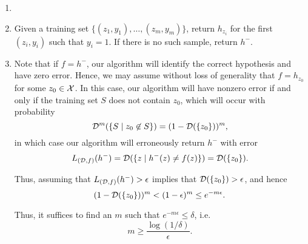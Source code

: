 \begin{ex}
  \begin{enumerate}
    \item[]
    \item Given a training set $\{(z_1, y_1), \ldots, (z_m, y_m)\}$,
          return $h_{z_i}$ for the first $(z_i, y_i)$ such that $y_i=1$.
          If there is no such sample, return $h^-$.
    \item Note that if $f=h^-$, our algorithm will identify the correct
          hypothesis and have zero error. Hence, we may assume without loss of
          generality that $f=h_{z_0}$ for some $z_0\in\mathcal{X}$. In this case, our
          algorithm will have nonzero error if and only if the training set $S$
          does not contain $z_0$, which will occur with probability
          \[
            \mathcal{D}^m(\{S \mid z_0\not\in S\})
            =(1-\mathcal{D}(\{z_0\}))^m,
          \]
          in which case our algorithm will erroneously
          return $h^-$ with error
          \[
            L_{(\mathcal{D}, f)}(h^-)=\mathcal{D}(\{z \mid h^-(z) \neq f(z) \})=\mathcal{D}(\{z_0\}).
          \]

          Thus, assuming that $L_{(\mathcal{D}, f)}(h^-)>\epsilon$ implies that
          $\mathcal{D}(\{z_0\})>\epsilon$, and hence
          \[
            (1-\mathcal{D}(\{z_0\}))^m<(1-\epsilon)^m\leq e^{-m\epsilon}.
          \]

          Thus, it suffices to find an $m$ such that $e^{-m\epsilon} \leq\delta$,
          i.e.\
          \[
            m \geq \frac{\log(1/\delta)}{\epsilon}.
          \]

  \end{enumerate}
\end{ex}

\begin{ex}
\end{ex}

\begin{ex}
\end{ex}

\begin{ex}
\end{ex}

\begin{ex}
\end{ex}

\begin{ex}
\end{ex}

\begin{ex}
\end{ex}

\begin{ex}
\end{ex}
